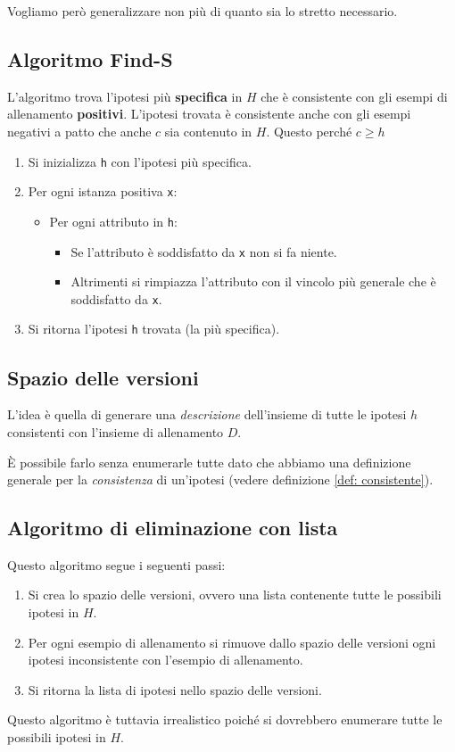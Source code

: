 Vogliamo per\`o generalizzare non pi\`u di quanto sia lo stretto necessario.

\subsection{Algoritmo Find-S}
L'algoritmo trova l'ipotesi pi\`u \textbf{specifica} in $H$ che \`e consistente con gli esempi di allenamento
\textbf{positivi}. L'ipotesi trovata \`e consistente anche con gli esempi negativi a patto che anche $c$ sia
contenuto in $H$. Questo perch\'e $c \geq h$
\begin{enumerate}
	\item Si inizializza \verb|h| con l'ipotesi pi\`u specifica.
	\item Per ogni istanza positiva \verb|x|:
	      \begin{itemize}
		      \item Per ogni attributo in \verb|h|:
		            \begin{itemize}
			            \item Se l'attributo \`e soddisfatto da \verb|x| non si fa niente.
			            \item Altrimenti si rimpiazza l'attributo con il vincolo pi\`u generale che \`e soddisfatto da
			                  \verb|x|.
		            \end{itemize}
	      \end{itemize}
	\item Si ritorna l'ipotesi \verb|h| trovata (la pi\`u specifica).
\end{enumerate}

\subsection{Spazio delle versioni}
L'idea \`e quella di generare una \emph{descrizione} dell'insieme di tutte le ipotesi $h$ consistenti con l'insieme di
allenamento $D$.

\`E possibile farlo senza enumerarle tutte dato che abbiamo una definizione generale per la \emph{consistenza} di
un'ipotesi (vedere definizione \ref{def: consistente}).

\subsection{Algoritmo di eliminazione con lista}
Questo algoritmo segue i seguenti passi:
\begin{enumerate}
	\item Si crea lo spazio delle versioni, ovvero una lista contenente tutte le possibili ipotesi in $H$.
	\item Per ogni esempio di allenamento si rimuove dallo spazio delle versioni ogni ipotesi inconsistente con l'esempio
	      di allenamento.
	\item Si ritorna la lista di ipotesi nello spazio delle versioni.
\end{enumerate}
Questo algoritmo \`e tuttavia irrealistico poich\'e si dovrebbero enumerare tutte le possibili ipotesi in $H$.

